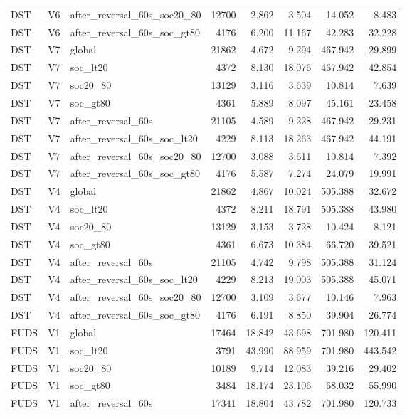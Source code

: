 \begin{tabular}{lllrrrrr}
DST & V6 & after\_reversal\_60s\_soc20\_80 & 12700 & 2.862 & 3.504 & 14.052 & 8.483 \\
DST & V6 & after\_reversal\_60s\_soc\_gt80 & 4176 & 6.200 & 11.167 & 42.283 & 32.228 \\
DST & V7 & global & 21862 & 4.672 & 9.294 & 467.942 & 29.899 \\
DST & V7 & soc\_lt20 & 4372 & 8.130 & 18.076 & 467.942 & 42.854 \\
DST & V7 & soc20\_80 & 13129 & 3.116 & 3.639 & 10.814 & 7.639 \\
DST & V7 & soc\_gt80 & 4361 & 5.889 & 8.097 & 45.161 & 23.458 \\
DST & V7 & after\_reversal\_60s & 21105 & 4.589 & 9.228 & 467.942 & 29.231 \\
DST & V7 & after\_reversal\_60s\_soc\_lt20 & 4229 & 8.113 & 18.263 & 467.942 & 44.191 \\
DST & V7 & after\_reversal\_60s\_soc20\_80 & 12700 & 3.088 & 3.611 & 10.814 & 7.392 \\
DST & V7 & after\_reversal\_60s\_soc\_gt80 & 4176 & 5.587 & 7.274 & 24.079 & 19.991 \\
DST & V4 & global & 21862 & 4.867 & 10.024 & 505.388 & 32.672 \\
DST & V4 & soc\_lt20 & 4372 & 8.211 & 18.791 & 505.388 & 43.980 \\
DST & V4 & soc20\_80 & 13129 & 3.153 & 3.728 & 10.424 & 8.121 \\
DST & V4 & soc\_gt80 & 4361 & 6.673 & 10.384 & 66.720 & 39.521 \\
DST & V4 & after\_reversal\_60s & 21105 & 4.742 & 9.798 & 505.388 & 31.124 \\
DST & V4 & after\_reversal\_60s\_soc\_lt20 & 4229 & 8.213 & 19.003 & 505.388 & 45.071 \\
DST & V4 & after\_reversal\_60s\_soc20\_80 & 12700 & 3.109 & 3.677 & 10.146 & 7.963 \\
DST & V4 & after\_reversal\_60s\_soc\_gt80 & 4176 & 6.191 & 8.850 & 39.904 & 26.774 \\
FUDS & V1 & global & 17464 & 18.842 & 43.698 & 701.980 & 120.411 \\
FUDS & V1 & soc\_lt20 & 3791 & 43.990 & 88.959 & 701.980 & 443.542 \\
FUDS & V1 & soc20\_80 & 10189 & 9.714 & 12.083 & 39.216 & 29.402 \\
FUDS & V1 & soc\_gt80 & 3484 & 18.174 & 23.106 & 68.032 & 55.990 \\
FUDS & V1 & after\_reversal\_60s & 17341 & 18.804 & 43.782 & 701.980 & 120.733 \\

\end{tabular}
